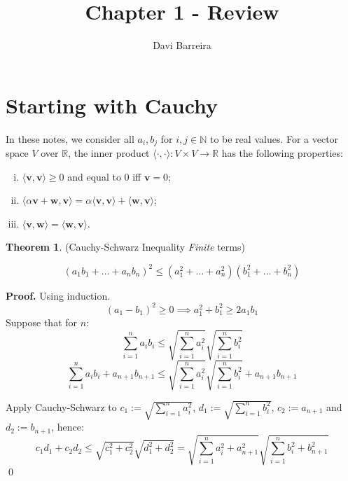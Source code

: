 \documentclass[11pt]{article}
\title{Chapter 1 - Review}
\author{Davi Barreira}
\theoremstyle{definition}
\newenvironment{prf}[1][Proof]{\textbf{#1.} }{\qed}
\newtheorem{theorem}{Theorem}[section]
\begin{document}
\maketitle
\thispagestyle{fancy}
\setcounter{section}{0}
\section{Starting with Cauchy}

In these notes, we consider all
$a_i, b_j$ for $i,j \in \mathbb N$ to be real values.
For a vector space $V$ over $\mathbb R$, the inner product
$\langle \cdot, \cdot \rangle: V \times V \to \mathbb R$ has the following
properties:
\begin{enumerate}[(i)]
    \item $\langle \mathbf v, \mathbf v \rangle \geq 0$ and equal to $0$ iff $\mathbf v = 0$;
    \item $\langle \alpha \mathbf v + \mathbf w, \mathbf v \rangle
    = \alpha \langle \mathbf v, \mathbf v \rangle + \langle \mathbf w, \mathbf v \rangle$;
    \item $\langle \mathbf v, \mathbf w \rangle = \langle \mathbf w, \mathbf v \rangle$.
\end{enumerate}

\begin{theorem}{(Cauchy-Schwarz Inequality \textit{Finite} terms)}
    
   \begin{equation}
    (a_1 b_1 + \dots + a_n b_n)^2 \leq
    (a_1^2 +  \dots + a_n^2)(b_1^2  + \dots + b_n^2)
   \end{equation}
\end{theorem}
\begin{shaded}
\begin{prf}
    Using induction.
    \begin{equation*}
        (a_1 - b_1)^2 \geq 0 \implies a_1^2 + b_1^2 \geq 2 a_1 b_1
    \end{equation*}
    Suppose that for $n$:
    \begin{equation*}
        \sum^n_{i=1} a_i b_i \leq
        \sqrt{\sum^n_{i=1}a_i^2}
        \sqrt{\sum^n_{i=1}b_i^2}
    \end{equation*}
    \begin{equation*}
        \sum^n_{i=1} a_i b_i
        + a_{n+1} b_{n+1}
        \leq
        \sqrt{\sum^n_{i=1}a_i^2}
        \sqrt{\sum^n_{i=1}b_i^2}
        + a_{n+1} b_{n+1}
    \end{equation*}

    Apply Cauchy-Schwarz to $c_1 := \sqrt{\sum^n_{i=1}a_i^2}$, $d_1 := \sqrt{\sum^n_{i=1}b_i^2}$,
    $c_2 := a_{n+1}$ and $d_2 := b_{n+1}$, hence:
    \begin{equation*}
        c_1 d_1 + c_2 d_2 \leq
        \sqrt{c_1 ^2 + c_2^2}
        \sqrt{d_1 ^2 + d_2^2} =
        \sqrt{\sum^n_{i=1}a_i^2 + a_{n+1}^2}
        \sqrt{\sum^n_{i=1}b_i^2 + b_{n+1}^2}
    \end{equation*}
\end{prf}
\end{shaded}
\end{document}
